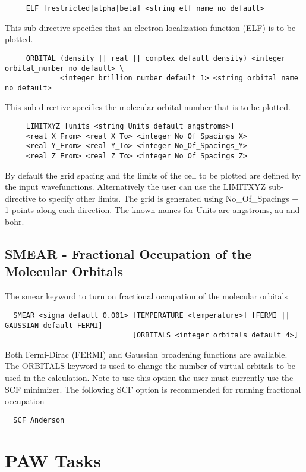 \begin{verbatim}
     ELF [restricted|alpha|beta] <string elf_name no default>
\end{verbatim}
This sub-directive specifies that an electron localization function (ELF) is to be plotted.

\begin{verbatim}
     ORBITAL (density || real || complex default density) <integer orbital_number no default> \
             <integer brillion_number default 1> <string orbital_name no default>
\end{verbatim}
This sub-directive specifies the molecular orbital number that is to be plotted.

\begin{verbatim}
     LIMITXYZ [units <string Units default angstroms>]
     <real X_From> <real X_To> <integer No_Of_Spacings_X>
     <real Y_From> <real Y_To> <integer No_Of_Spacings_Y>
     <real Z_From> <real Z_To> <integer No_Of_Spacings_Z>
\end{verbatim}
By default the grid spacing and the limits of the cell to be plotted are defined by the input wavefunctions.  Alternatively the user can use the LIMITXYZ sub-directive to specify other limits.  The grid is generated using No\_Of\_Spacings + 1 points along each direction. The known names for Units are angstroms, au and bohr.

\subsection{SMEAR - Fractional Occupation of the Molecular Orbitals}
\label{sec:band_smear}
The smear keyword to turn on fractional occupation of the molecular orbitals
\begin{verbatim}
  SMEAR <sigma default 0.001> [TEMPERATURE <temperature>] [FERMI || GAUSSIAN default FERMI] 
                              [ORBITALS <integer orbitals default 4>]
\end{verbatim}
Both Fermi-Dirac (FERMI) and Gaussian broadening functions are available.  The ORBITALS keyword is used to change
the number of virtual orbitals to be used in the calculation.  Note to use this option the user must currently use the
SCF minimizer.  The following SCF option is recommended for running fractional occupation
\begin{verbatim}
  SCF Anderson
\end{verbatim}


\section{PAW Tasks}
\label{sec:paw_tasks}


